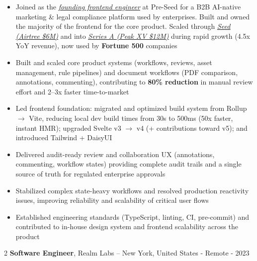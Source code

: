 \documentclass[10pt, a4paper]{article}
\newenvironment{highlights}{ \begin{itemize}[ topsep=0.10 cm, parsep=0.10 cm, partopsep=0pt,
itemsep=0pt, leftmargin=0 cm + 10pt ] }{ \end{itemize} } %
\newenvironment{twocolentry}[2][]{ \onecolentry \def\secondColumn{#2} \setcolumnwidth{\fill, 4.5 cm}
\begin{paracol}{2} }{ \switchcolumn \raggedleft \secondColumn \end{paracol}
\endonecolentry } %
\begin{document}
	\begin{highlights}
		\item Joined as the \href{https://www.linkedin.com/posts/liamking97_ai-start-ups-score-245m-funding-windfall-activity-7101717182698459136-KD0C}{\underline{\textit{founding frontend engineer}}}
		at Pre-Seed for a B2B AI-native marketing \& legal compliance platform used by
		enterprises. Built and owned the majority of the frontend for the core
		product. Scaled through \href{https://www.capitalbrief.com/article/haast-raises-6-million-to-transform-compliance-with-ai-automation-24f00fee-be78-4b0b-be61-dc0019789885/}{\underline{\textit{Seed (Airtree \$6M)}}}
		and into \href{https://www.axios.com/pro/enterprise-software-deals/2026/04/09/enterprise-compliance-haast-12-m}{\underline{\textit{Series A (Peak XV \$12M)}}}
		during rapid growth (4.5x YoY revenue), now used by \textbf{Fortune 500}
		companies

		\item Built and scaled core product systems (workflows, reviews, asset
		management, rule pipelines) and document workflows (PDF comparison,
		annotations, commenting), contributing to \textbf{80\% reduction} in manual
		review effort and 2--3x faster time-to-market

		\item Led frontend foundation: migrated and optimized build system from Rollup
		$\rightarrow$ Vite, reducing local dev build times from 30s to 500ms (50x faster,
		instant HMR); upgraded Svelte v3 $\rightarrow$ v4 (+ contributions toward v5);
		and introduced Tailwind + DaisyUI

		\item Delivered audit-ready review and collaboration UX (annotations,
		commenting, workflow states) providing complete audit trails and a single
		source of truth for regulated enterprise approvals

		\item Stabilized complex state-heavy workflows and resolved production reactivity
		issues, improving reliability and scalability of critical user flows

		\item Established engineering standards (TypeScript, linting, CI, pre-commit)
		and contributed to in-house design system and frontend scalability across
		the product
	\end{highlights}

	\vspace{0.2 cm}

	\begin{twocolentry}
		{2022 - 2023} \textbf{Software Engineer}, Realm Labs -- New York, United States
		- Remote
	\end{twocolentry}
\end{document}
